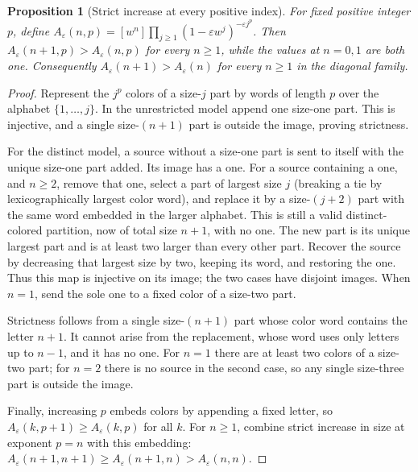 \documentclass[11pt,letterpaper]{article}
\numberwithin{equation}{section}
\newtheorem{proposition}[theorem]{Proposition}
\theoremstyle{definition}\newtheorem{definition}[theorem]{Definition}
\theoremstyle{remark}\newtheorem{remark}[theorem]{Remark}
\newcommand{\eps}{\varepsilon}
\newcommand{\coef}[2]{[#1^{#2}]}
\begin{document}
\begin{proposition}[Strict increase at every positive index]\label{det:dia:prop:monotone}
For fixed positive integer $p$, define
$A_\eps(n,p)=\coef{w}{n}\prod_{j\geq1}(1-\eps w^j)^{-\eps j^p}$.
Then $A_\eps(n+1,p)>A_\eps(n,p)$ for every $n\geq1$, while the
values at $n=0,1$ are both one. Consequently
$A_\eps(n+1)>A_\eps(n)$ for every $n\geq1$ in the diagonal family.
\end{proposition}
\begin{proof}
Represent the $j^p$ colors of a size-$j$ part by words of length $p$
over the alphabet $\{1,\ldots,j\}$. In the unrestricted model append
one size-one part. This is injective, and a single size-$(n+1)$ part
is outside the image, proving strictness.

For the distinct model, a source without a size-one part is sent to
itself with the unique size-one part added. Its image has a one.
For a source containing a one, and $n\geq2$, remove that one, select a
part of largest size $j$ (breaking a tie by lexicographically largest
color word), and replace it by a size-$(j+2)$ part with the same word
embedded in the larger alphabet. This is still a valid distinct-colored
partition, now of total size $n+1$, with no one. The new part is its
unique largest part and is at least two larger than every other part.
Recover the source by decreasing that largest size by two, keeping its
word, and restoring the one. Thus this map is injective on its image;
the two cases have disjoint images. When $n=1$, send the sole one to a
fixed color of a size-two part.

Strictness follows from a single size-$(n+1)$ part whose color word
contains the letter $n+1$. It cannot arise from the replacement, whose
word uses only letters up to $n-1$, and it has no one. For $n=1$ there
are at least two colors of a size-two part; for $n=2$ there is no source
in the second case, so any single size-three part is outside the image.

Finally, increasing $p$ embeds colors by appending a fixed letter,
so $A_\eps(k,p+1)\geq A_\eps(k,p)$ for all $k$. For $n\geq1$,
combine strict increase in size at exponent $p=n$ with this embedding:
$A_\eps(n+1,n+1)\geq A_\eps(n+1,n)>A_\eps(n,n)$.
\end{proof}
\end{document}
